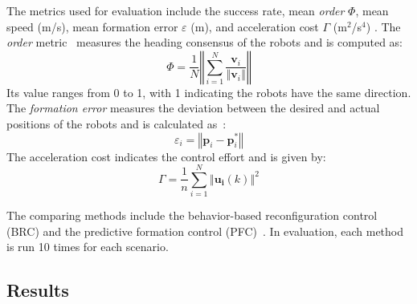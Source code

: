The metrics used for evaluation include the success rate, mean \textit{order} $\Phi$, mean speed (m/s), mean formation error $\varepsilon$ (m), and acceleration cost $\Gamma$ (m$^2$/s$^4$) \cite{Zhang2021}. The \textit{order} metric~\cite{Vicsek1995} measures the heading consensus of the robots and is computed as:
\begin{equation}
    \Phi=\dfrac{1}{N}\left\Vert\sum_{i=1}^N{\dfrac{\mathbf{v}_i}{\left\Vert \mathbf{v}_i\right\Vert}}\right\Vert
\end{equation}
Its value ranges from 0 to 1, with 1 indicating the robots have the same direction. The \textit{formation error} measures the deviation between the desired and actual positions of the robots and is calculated as~\cite{6798711}:
\begin{equation}
    \varepsilon_i = \left\Vert \mathbf{p}_i-\mathbf{p}^*_i\right\Vert
\end{equation} 
The acceleration cost indicates the control effort and is given by:
\begin{equation}
    \Gamma = \dfrac{1}{n}\sum_{i=1}^N{\left\Vert \mathbf{u_i}(k)\right\Vert^2}
\end{equation} 

The comparing methods include the behavior-based reconfiguration control (BRC) \cite{Vsrhelyi2018} and the predictive formation control (PFC)~\cite{9562281}. In evaluation, each method is run 10 times for each scenario.   

\subsection{Results}
\label{subsec:results}

